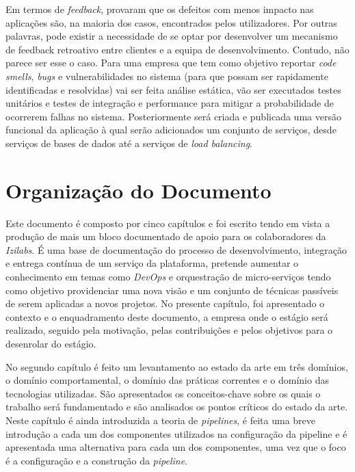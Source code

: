 \hspace{1cm}Em termos de \textit{feedback},  provaram que os defeitos com menos impacto nas aplicações são, na maioria dos casos, encontrados pelos utilizadores. Por outras palavras, pode existir a necessidade de se optar por desenvolver um mecanismo de feedback retroativo entre clientes e a equipa de desenvolvimento. Contudo, não parece ser esse o caso. Para uma empresa que tem como objetivo reportar \textit{code smells}, \textit{bugs} e vulnerabilidades no sistema (para que possam ser rapidamente identificadas e resolvidas) vai ser feita análise estática, vão ser executados testes unitários e testes de integração e performance para mitigar a probabilidade de ocorrerem falhas no sistema. Posteriormente será criada e publicada uma versão funcional da aplicação à qual serão adicionados um conjunto de serviços, desde serviços de bases de dados até a serviços de \textit{load balancing}.


\section{Organização do Documento}

\hspace{1cm}Este documento é composto por cinco capítulos e foi escrito tendo em vista a produção de mais um bloco documentado de apoio para os colaboradores da \textit{Izilabs}. É uma base de documentação do processo de desenvolvimento, integração e entrega contínua de um serviço da plataforma, pretende aumentar o conhecimento em temas como \textit{DevOps} e orquestração de micro-serviços tendo como objetivo  providenciar uma nova visão e um conjunto de técnicas passíveis de serem aplicadas a novos projetos. No presente capítulo, foi apresentado o contexto e o enquadramento deste documento, a empresa onde o estágio será realizado, seguido pela motivação, pelas contribuições e pelos objetivos para o desenrolar do estágio.

\hspace{1cm}No segundo capítulo é feito um levantamento ao estado da arte em três domínios, o domínio comportamental, o domínio das práticas correntes e o domínio das tecnologias utilizadas. São apresentados os conceitos-chave sobre os quais o trabalho será fundamentado e são analisados os pontos críticos do estado da arte. Neste capítulo é ainda introduzida a teoria de \textit{pipelines}, é feita uma breve introdução a cada um dos componentes utilizados na configuração da pipeline e é apresentada uma alternativa para cada um dos componentes, uma vez que o foco é a configuração e a construção da \textit{pipeline}. 

